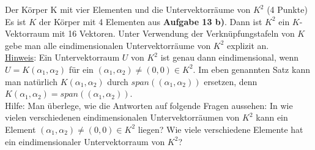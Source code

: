 \documentclass{uebblatt}
\begin{document}
\begin{aufgabe}{Der Körper K mit vier Elementen und die Untervektorräume von $K^2$ (4 Punkte)}
Es ist $K$ der Körper mit 4 Elementen aus \textbf{Aufgabe 13 b)}. Dann ist $K^2$ ein $K$-Vektorraum mit 16 Vektoren. Unter Verwendung der Verknüpfungstafeln von $K$ gebe man alle eindimensionalen Untervektorräume von $K^2$ explizit an. \vspace{1.5mm} \\
\underline{Hinweis}: Ein Untervektorraum $U$ von $K^2$ ist genau dann eindimensional, wenn $U = K(\alpha_1, \alpha_2)$ für ein $(\alpha_1, \alpha_2) \neq (0, 0) \in K^2$. Im eben genannten Satz kann man natürlich $K(\alpha_1, \alpha_2)$ durch $span((\alpha_1, \alpha_2))$ ersetzen, denn $K(\alpha_1, \alpha_2) = span((\alpha_1, \alpha_2))$.\vspace{1.5mm} \\
Hilfe: Man überlege, wie die Antworten auf folgende Fragen aussehen: In wie vielen verschiedenen eindimensionalen Untervektorräumen von $K^2$ kann ein Element $(\alpha_1, \alpha_2) \neq (0, 0) \in K^2$ liegen? Wie viele verschiedene Elemente hat ein eindimensionaler Untervektorraum von $K^2$?
\end{aufgabe}
\end{document}
